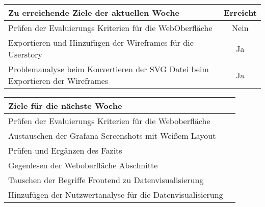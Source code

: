 \begin{tabularx}{\textwidth}{Xc}
    \arrayrulecolor{OliveGreen}
    \toprule
    {\bfseries Zu erreichende Ziele der aktuellen Woche} & {\bfseries Erreicht} \\
    \midrule[2pt]
    Prüfen der Evaluierungs Kriterien für die WebOberfläche &Nein            \\
    \rowcolor{OliveGreen!15}
    Exportieren und Hinzufügen der Wireframes für die Userstory      &Ja     \\
    \rowcolor{White}
    Problemanalyse beim Konvertieren der SVG Datei beim Exportieren der
    Wireframes                                              &Ja              \\
    \bottomrule[2pt]
\end{tabularx}
%
\vspace{1cm}
%
\begin{tabularx}{\textwidth}{Xc}
    \arrayrulecolor{OliveGreen}
    \toprule
    {\bfseries Ziele für die nächste Woche}        &                         \\
    \midrule[2pt]
    Prüfen der Evaluierungs Kriterien für die Weboberfläche    &             \\
    \rowcolor{OliveGreen!15}
    Austauschen der Grafana Screenshots mit Weißem Layout  &                 \\
    \rowcolor{White}
    Prüfen und Ergänzen des Fazits                         &                 \\
    \rowcolor{OliveGreen!15}
    Gegenlesen der Weboberfläche Abschnitte               &                  \\
    \rowcolor{White}
    Tauschen der Begriffe Frontend zu Datenvisualisierung &                  \\
    \rowcolor{OliveGreen!15}
    Hinzufügen der Nutzwertanalyse für die Datenvisualisierung &             \\
\end{tabularx}
